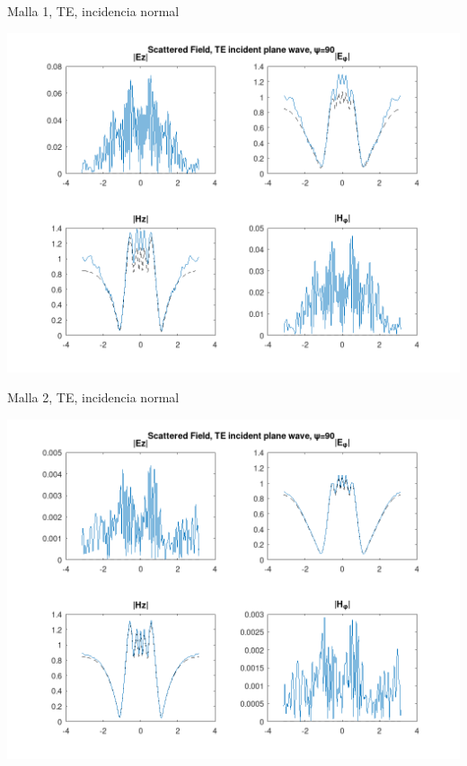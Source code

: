 \documentclass[smaller,xcolor=table,dvipsnames]{beamer}
\begin{document}

\begin{frame}{Malla 1, TE, incidencia normal}

\includegraphics[width=0.95\linewidth]{pec_y_malla_gorda_90_TE/NF.png}
  
\end{frame}
  

\begin{frame}{Malla 2, TE, incidencia normal}

\includegraphics[width=0.95\linewidth]{pec_y_malla_fina_90_TE/NF.png}
  
\end{frame}
\end{document}
